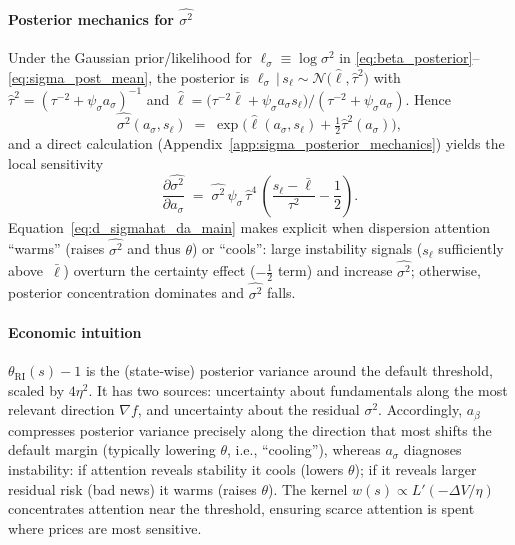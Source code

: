 \documentclass[12pt]{article}
\theoremstyle{plain}
\begin{document}
\paragraph{Posterior mechanics for $\widehat{\sigma^2}$}
Under the Gaussian prior/likelihood for $\ell_\sigma\equiv\log\sigma^2$ in \eqref{eq:beta_posterior}–\eqref{eq:sigma_post_mean}, the posterior is $\ell_\sigma\,|\,s_\ell\sim\mathcal N\big(\hat\ell,\hat\tau^2\big)$ with $\hat\tau^2=(\tau^{-2}+\psi_\sigma a_\sigma)^{-1}$ and $\hat\ell=\big(\tau^{-2}\bar\ell+\psi_\sigma a_\sigma s_\ell\big)/(\tau^{-2}+\psi_\sigma a_\sigma)$. Hence
\begin{equation}\label{eq:sigma_post_closed}
	\widehat{\sigma^2}(a_\sigma,s_\ell)\;=\;\exp\!\Big(\hat\ell(a_\sigma,s_\ell)+\tfrac12\hat\tau^2(a_\sigma)\Big),
\end{equation}
and a direct calculation (Appendix~\ref{app:sigma_posterior_mechanics}) yields the local sensitivity
\begin{equation}\label{eq:d_sigmahat_da_main}
	\frac{\partial\widehat{\sigma^2}}{\partial a_\sigma}\;=\;\widehat{\sigma^2}\,\psi_\sigma\,\hat\tau^4\,\left(\frac{s_\ell-\bar\ell}{\tau^2}-\frac{1}{2}\right).
\end{equation}
Equation~\eqref{eq:d_sigmahat_da_main} makes explicit when dispersion attention ``warms'' (raises $\widehat{\sigma^2}$ and thus $\theta$) or ``cools'': large instability signals ($s_\ell$ sufficiently above~$\bar\ell$) overturn the certainty effect ($-\tfrac12$ term) and increase $\widehat{\sigma^2}$; otherwise, posterior concentration dominates and $\widehat{\sigma^2}$ falls.

\paragraph{Economic intuition} $\theta_{\mathrm{RI}}(s)-1$ is the (state‑wise) posterior variance around the default threshold, scaled by $4\eta^2$. It has two sources: uncertainty about fundamentals along the most relevant direction $\nabla f$, and uncertainty about the residual $\sigma^2$. Accordingly, $a_\beta$ compresses posterior variance precisely along the direction that most shifts the default margin (typically lowering $\theta$, i.e., “cooling”), whereas $a_\sigma$ diagnoses instability: if attention reveals stability it cools (lowers $\theta$); if it reveals larger residual risk (bad news) it warms (raises $\theta$). The kernel $w(s)\propto L'(-\Delta V/\eta)$ concentrates attention near the threshold, ensuring scarce attention is spent where prices are most sensitive.
\end{document}
